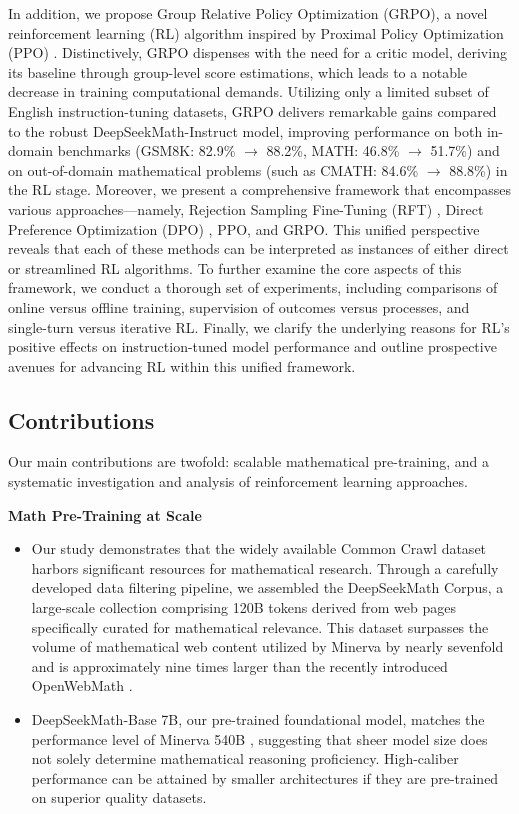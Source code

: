 In addition, we propose Group Relative Policy Optimization (GRPO), a novel reinforcement learning (RL) algorithm inspired by Proximal Policy Optimization (PPO) \citep{schulman2017proximal}. Distinctively, GRPO dispenses with the need for a critic model, deriving its baseline through group-level score estimations, which leads to a notable decrease in training computational demands. Utilizing only a limited subset of English instruction-tuning datasets, GRPO delivers remarkable gains compared to the robust DeepSeekMath-Instruct model, improving performance on both in-domain benchmarks (GSM8K: 82.9\% $\rightarrow$ 88.2\%, MATH: 46.8\% $\rightarrow$ 51.7\%) and on out-of-domain mathematical problems (such as CMATH: 84.6\% $\rightarrow$ 88.8\%) in the RL stage. Moreover, we present a comprehensive framework that encompasses various approaches—namely, Rejection Sampling Fine-Tuning (RFT) \citep{yuan2023scaling}, Direct Preference Optimization (DPO) \citep{dpo}, PPO, and GRPO. This unified perspective reveals that each of these methods can be interpreted as instances of either direct or streamlined RL algorithms. To further examine the core aspects of this framework, we conduct a thorough set of experiments, including comparisons of online versus offline training, supervision of outcomes versus processes, and single-turn versus iterative RL. Finally, we clarify the underlying reasons for RL's positive effects on instruction-tuned model performance and outline prospective avenues for advancing RL within this unified framework.

\subsection{Contributions}
Our main contributions are twofold: scalable mathematical pre-training, and a systematic investigation and analysis of reinforcement learning approaches.

\textbf{Math Pre-Training at Scale}

\begin{itemize}[topsep=0pt]
    \item Our study demonstrates that the widely available Common Crawl dataset harbors significant resources for mathematical research. Through a carefully developed data filtering pipeline, we assembled the DeepSeekMath Corpus, a large-scale collection comprising 120B tokens derived from web pages specifically curated for mathematical relevance. This dataset surpasses the volume of mathematical web content utilized by Minerva \citep{minerva} by nearly sevenfold and is approximately nine times larger than the recently introduced OpenWebMath \citep{openwebmath}.
    
    \item DeepSeekMath-Base 7B, our pre-trained foundational model, matches the performance level of Minerva 540B \citep{minerva}, suggesting that sheer model size does not solely determine mathematical reasoning proficiency. High-caliber performance can be attained by smaller architectures if they are pre-trained on superior quality datasets.
\end{itemize}


